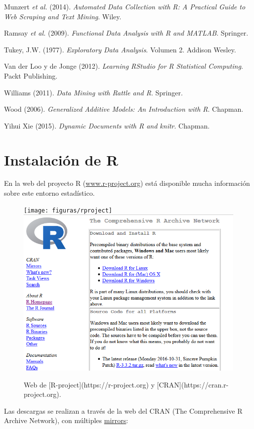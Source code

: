 \documentclass[
]{book}
\theoremstyle{break}
\theoremstyle{nonumberplain}
\begin{document}
Munzert \emph{et al.} (2014). \emph{Automated Data Collection with R:
A Practical Guide to Web Scraping and Text Mining}. Wiley.

Ramsay \emph{et al.} (2009). \emph{Functional Data Analysis with R and MATLAB}.
Springer.

Tukey, J.W. (1977). \emph{Exploratory Data Analysis}. Volumen 2. Addison Wesley.

Van der Loo y de Jonge (2012). \emph{Learning RStudio for R Statistical
Computing}. Packt Publishing.

Williams (2011). \emph{Data Mining with Rattle and R}. Springer.

Wood (2006). \emph{Generalized Additive Models: An Introduction with R}. Chapman.

Yihui Xie (2015). \emph{Dynamic Documents with R and knitr}. Chapman.

\hypertarget{appendix-apendices}{%
\appendix}


\hypertarget{instalacion}{%
\chapter{Instalación de R}\label{instalacion}}

En la web del proyecto R (\href{http://www.r-project.org}{www.r-project.org}) está disponible mucha información sobre este entorno estadístico.

\begin{figure}[!htb]

{\centering \texttt{[image: figuras/rproject]} \includegraphics[width=0.45\linewidth]{figuras/cran} 

}

\caption{Web de [R-project](https://r-project.org) y [CRAN](https://cran.r-project.org).}\label{fig:rproject}
\end{figure}

Las descargas se realizan a través de la web del CRAN (The Comprehensive R Archive Network), con múltiples \href{https://cran.r-project.org/mirrors.html}{mirrors}:
\end{document}
